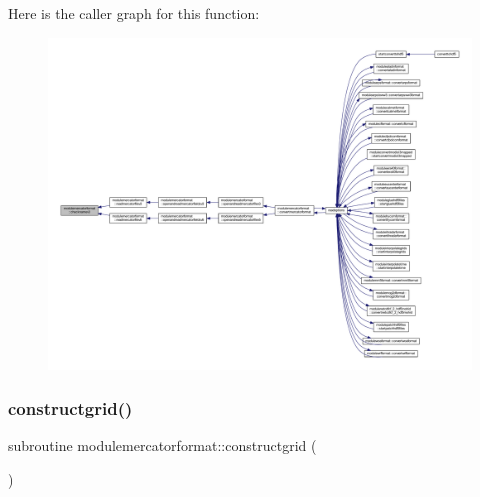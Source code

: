Here is the caller graph for this function\+:\nopagebreak
\begin{figure}[H]
\begin{center}
\leavevmode
\includegraphics[width=350pt]{namespacemodulemercatorformat_aa50cf57bf22a01dde1d85b4dd1d6baa0_icgraph}
\end{center}
\end{figure}
\mbox{\label{namespacemodulemercatorformat_abe7eddb3220bab2097cf2622ced34f57}} 
\subsubsection{\texorpdfstring{constructgrid()}{constructgrid()}}
{\footnotesize\ttfamily subroutine modulemercatorformat\+::constructgrid (\begin{DoxyParamCaption}{ }\end{DoxyParamCaption})\hspace{0.3cm}{\ttfamily [private]}}

